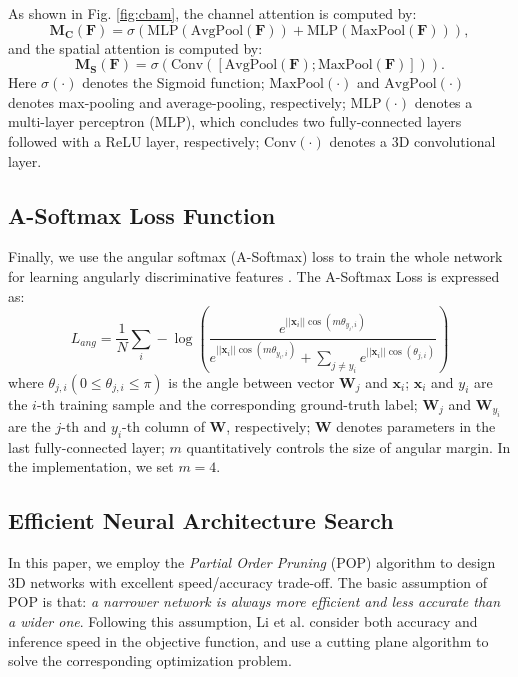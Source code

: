 \documentclass[final,5p,times,twocolumn]{elsarticle}
\begin{document}
As shown in Fig. \ref{fig:cbam}, the channel attention is computed by:
\begin{equation}
\mathbf{M_C}(\mathbf{F})=\sigma(\mathrm{MLP}(\mathrm{AvgPool}(\mathbf{F})) + \mathrm{MLP}(\mathrm{MaxPool}(\mathbf{F}))),
\end{equation}
and the spatial attention is computed by: 
\begin{equation}
\mathbf{M_S}(\mathbf{F})=\sigma(\mathrm{Conv}([\mathrm{AvgPool}(\mathbf{F}); \mathrm{MaxPool}(\mathbf{F})])).
\end{equation}
Here $\sigma(\cdot)$ denotes the Sigmoid function; $\mathrm{MaxPool}(\cdot)$ and $\mathrm{AvgPool}(\cdot)$ denotes max-pooling and average-pooling, respectively; $\mathrm{MLP}(\cdot)$ denotes a multi-layer perceptron (MLP), which concludes two fully-connected layers followed with a ReLU layer, respectively; $\mathrm{Conv}(\cdot)$ denotes a 3D convolutional layer.


\subsection{A-Softmax Loss Function}
\label{ssec:obj}
Finally, we use the angular softmax (A-Softmax) loss to train the whole network for learning angularly discriminative features \citep{Liu2017SphereFace}. The A-Softmax Loss is expressed as:
\begin{equation}
L_{ang}=\frac{1}{N}\sum_{i}-\log(\frac{e^{||\mathbf{x}_i||\cos(m\theta_{y_i,i})}}{e^{||\mathbf{x}_i||\cos(m\theta_{y_i,i})} + \sum_{j\not ={y_i}}e^{||\mathbf{x}_i||\cos(\theta_{j,i})}})
\label{eq:loss}
\end{equation}
where $\theta_{j,i} (0 \leq \theta_{j,i} \leq \pi)$ is the angle between vector $\mathbf{W}_j$ and $\mathbf{x}_i$; $\mathbf{x}_i$ and $y_i$ are the $i$-th training sample and the corresponding ground-truth label; $\mathbf{W}_j$ and $\mathbf{W}_{y_i}$ are the $j$-th and $y_i$-th column of $\mathbf{W}$, respectively; $\mathbf{W}$ denotes parameters in the last fully-connected layer; $m$ quantitatively controls the size of angular margin. In the implementation, we set $m=4$.


\subsection{Efficient Neural Architecture Search}
\label{ssec:3dnas}

In this paper, we employ the \emph{Partial Order Pruning} (POP) \citep{li2019partial} algorithm to design 3D networks with excellent speed/accuracy trade-off. The basic assumption of POP is that: \textit{a narrower network is always more efficient and less accurate than a wider one}. Following this assumption, Li et al. consider both accuracy and inference speed in the objective function, and use a cutting plane algorithm to solve the corresponding optimization problem. 
\end{document}
